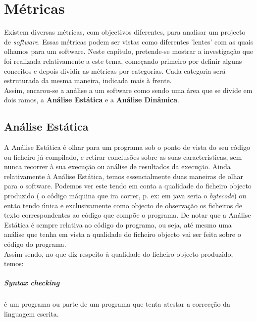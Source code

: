 \chapter{Métricas}\label{chap:metricas}
\minitoc

Existem diversas métricas, com objectivos diferentes, para analisar um projecto de \emph{software}. Essas métricas podem ser vistas como diferentes 'lentes' com as quais olhamos para um software. 
Neste capítulo, pretende-se mostrar a investigação que foi realizada relativamente a este tema, começando primeiro por definir alguns conceitos e depois dividir as métricas 
por categorias. Cada categoria será estruturada da mesma maneira, indicada mais à frente.\\

Assim, encarou-se a análise a um software como sendo uma área que se divide em dois ramos, a \textbf{Análise Estática} e a \textbf{Análise Dinâmica}.\\

\section{Análise Estática}
A Análise Estática é olhar para um programa sob o ponto de vista do seu código ou ficheiro já compilado, e retirar conclusões sobre as suas características, 
sem nunca recorrer à sua execução ou análise de resultados da execução.
Ainda relativamente à Análise Estática, temos essencialmente duas maneiras de olhar para o software. Podemos ver este tendo em conta a qualidade do ficheiro objecto 
produzido ( o código máquina que ira correr, p. ex: em java seria o \emph{bytecode}) ou então tendo única e exclusivamente como objecto de observação os ficheiros de 
texto correspondentes ao código que compõe o programa.
De notar que a Análise Estática é sempre relativa ao código do programa, ou seja, até mesmo uma análise que tenha em vista a qualidade do ficheiro objecto vai 
ser feita sobre o código do programa.\\

Assim sendo, no que diz respeito à qualidade do ficheiro objecto produzido, temos:

\paragraph{Syntax checking} é um programa ou parte de um programa que tenta atestar a correcção da linguagem escrita.

